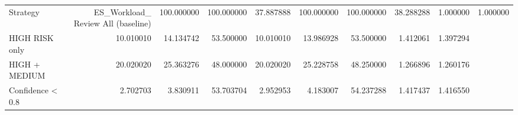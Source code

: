 \begin{tabular}{lrrrrrrrr}
\toprule
Strategy & ES_Workload_%
\midrule
Review All (baseline) & 100.000000 & 100.000000 & 37.887888 & 100.000000 & 100.000000 & 38.288288 & 1.000000 & 1.000000 \\
HIGH RISK only & 10.010010 & 14.134742 & 53.500000 & 10.010010 & 13.986928 & 53.500000 & 1.412061 & 1.397294 \\
HIGH + MEDIUM & 20.020020 & 25.363276 & 48.000000 & 20.020020 & 25.228758 & 48.250000 & 1.266896 & 1.260176 \\
Confidence < 0.8 & 2.702703 & 3.830911 & 53.703704 & 2.952953 & 4.183007 & 54.237288 & 1.417437 & 1.416550 \\
\bottomrule
\end{tabular}
